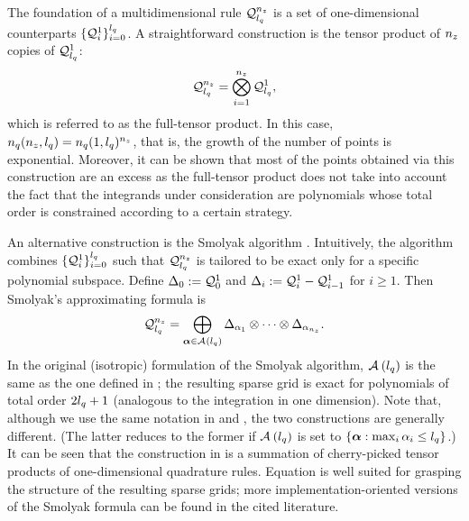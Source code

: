 The foundation of a multidimensional rule $\quadrature{\nz}{\lq}$ is a set of
one-dimensional counterparts $\{ \quadrature{1}{i} \}_{i = 0}^\lq$. A
straightforward construction is the tensor product of ${n_{z}}$ copies of
$\quadrature{1}{\lq}$:
\[
  \quadrature{\nz}{\lq} = \bigotimes_{i = 1}^\nz \quadrature{1}{\lq},
\]
which is referred to as the full-tensor product. In this case, ${n_{q}}({n_{z}},
{l_{q}}) = {n_{q}}(1, {l_{q}})^{n_{z}}$, that is, the growth of the number of points is
exponential. Moreover, it can be shown that most of the points obtained via this
construction are an excess as the full-tensor product does not take into account
the fact that the integrands under consideration are polynomials whose total
order is constrained according to a certain strategy.

An alternative construction is the Smolyak algorithm \cite{maitre2010,
eldred2008}. Intuitively, the algorithm combines $\{ \quadrature{1}{i} \}_{i =
0}^\lq$ such that $\quadrature{\nz}{\lq}$ is tailored to be exact only for a
specific polynomial subspace. Define $\Delta_0 := \quadrature{1}{0}$ and
$\Delta_i := \quadrature{1}{i} - \quadrature{1}{i - 1}$ for $i \geq 1$. Then
Smolyak's approximating formula is
\[
  \quadrature{\nz}{\lq} = \bigoplus_{\multiindex \in \multiindices{\lq}} \Delta_{\alpha_1} \otimes \cdots \otimes \Delta_{\alpha_\nz}.
\]
In the original (isotropic) formulation of the Smolyak algorithm,
$\mathcal{A}_{}\left({l_{q}}\right)$ is the same as the one defined in
; the resulting sparse grid is exact for
polynomials of total order $2 {l_{q}} + 1$ (analogous to the integration in one
dimension). Note that, although we use the same notation in
 and , the two
constructions are generally different. (The latter reduces to the former if
$\mathcal{A}_{}\left({l_{q}}\right)$ is set to $\{ \boldsymbol{\alpha}: \max_i \alpha_i
\leq {l_{q}} \}$.) It can be seen that the construction in
 is a summation of cherry-picked tensor products of
one-dimensional quadrature rules. Equation  is well
suited for grasping the structure of the resulting sparse grids; more
implementation-oriented versions of the Smolyak formula can be found in the
cited literature.
